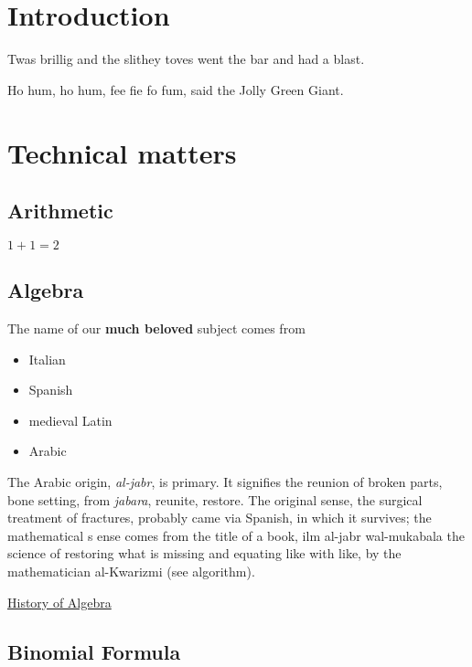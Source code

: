\section{Introduction}

Twas brillig and the slithey toves
went the bar and had a blast.


Ho hum, ho hum, fee fie fo fum,
said the Jolly Green Giant.




\section{Technical matters}

\subsection{Arithmetic}

$1 + 1 = 2$




\subsection{Algebra}

The name of our \textbf{much beloved} subject
comes from


\begin{itemize}

\item Italian

\item Spanish

\item medieval Latin

\item Arabic

\end{itemize}


The Arabic origin, \emph{al-jabr}, is primary.
It signifies the reunion of broken parts, bone setting,
from \emph{jabara}, reunite, restore. The original sense,
the surgical treatment of fractures, probably came
via Spanish, in which it survives; the mathematical s
ense comes from the title of a book,
ilm al-jabr wal-mukabala the science of
restoring what is missing and equating like with
like, by the mathematician al-Kwarizmi (see algorithm).


\href{http://en.wikipedia.org/wiki/History_of_algebra}{History of Algebra}




\subsection{Binomial Formula}

